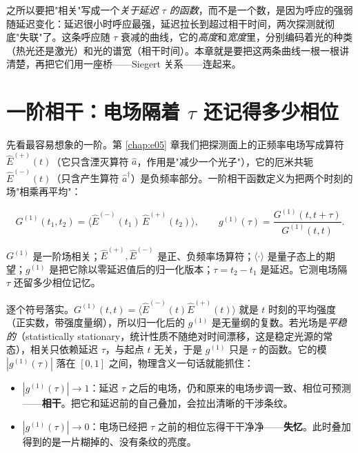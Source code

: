 之所以要把"相关"写成一个\emph{关于延迟 \(\tau\) 的函数}，而不是一个数，是因为呼应的强弱随延迟变化：延迟很小时呼应最强，延迟拉长到超过相干时间，两次探测就彻底"失联"了。这条呼应随 \(\tau\) 衰减的曲线，它的\emph{高度}和\emph{宽度}里，分别编码着光的种类（热光还是激光）和光的谱宽（相干时间）。本章就是要把这两条曲线一根一根讲清楚，再把它们用一座桥——Siegert 关系——连起来。

\section{一阶相干：电场隔着 \texorpdfstring{$\tau$}{tau} 还记得多少相位}
\label{sec:e08-g1}

先看最容易想象的一阶。第 \ref{chap:e05} 章我们把探测面上的正频率电场写成算符 \(\hat E^{(+)}(t)\)（它只含湮灭算符 \(\hat a\)，作用是"减少一个光子"），它的厄米共轭 \(\hat E^{(-)}(t)\)（只含产生算符 \(\hat a^\dagger\)）是负频率部分。一阶相干函数定义为把两个时刻的场"相乘再平均"：

\begin{equation}
  G^{(1)}(t_1,t_2)=\big\langle \hat E^{(-)}(t_1)\,\hat E^{(+)}(t_2)\big\rangle,
  \qquad
  g^{(1)}(\tau)=\frac{G^{(1)}(t,t+\tau)}{G^{(1)}(t,t)} .
  \label{eq:e08-g1}
\end{equation}
\begin{formulaexplain}
\(G^{(1)}\) 是一阶场相关；\(\hat E^{(+)},\hat E^{(-)}\) 是正、负频率场算符；\(\langle\cdot\rangle\) 是量子态上的期望；\(g^{(1)}\) 是把它除以零延迟值后的归一化版本；\(\tau=t_2-t_1\) 是延迟。它测电场隔 \(\tau\) 还留多少相位记忆。
\end{formulaexplain}

逐个符号落实。\(G^{(1)}(t,t)=\langle\hat E^{(-)}(t)\hat E^{(+)}(t)\rangle\) 就是 \(t\) 时刻的平均强度（正实数，带强度量纲），所以归一化后的 \(g^{(1)}\) 是无量纲的复数。若光场是\emph{平稳的}（statistically stationary，统计性质不随绝对时间漂移，这是稳定光源的常态），相关只依赖延迟 \(\tau\)，与起点 \(t\) 无关，于是 \(g^{(1)}\) 只是 \(\tau\) 的函数。它的模 \(|g^{(1)}(\tau)|\) 落在 \([0,1]\) 之间，物理含义一句话就能抓住：

\begin{itemize}
  \item \(|g^{(1)}(\tau)|\to1\)：延迟 \(\tau\) 之后的电场，仍和原来的电场步调一致、相位可预测——\textbf{相干}。把它和延迟前的自己叠加，会拉出清晰的干涉条纹。
  \item \(|g^{(1)}(\tau)|\to0\)：电场已经把 \(\tau\) 之前的相位忘得干干净净——\textbf{失忆}。此时叠加得到的是一片糊掉的、没有条纹的亮度。
\end{itemize}

